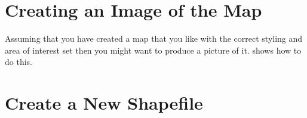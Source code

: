 \section{Creating an Image of the Map}
Assuming that you have created a map that you like with the correct styling and area of interest 
set then you might want to produce a picture of it.  shows how to do this.



\section{Create a New Shapefile}



